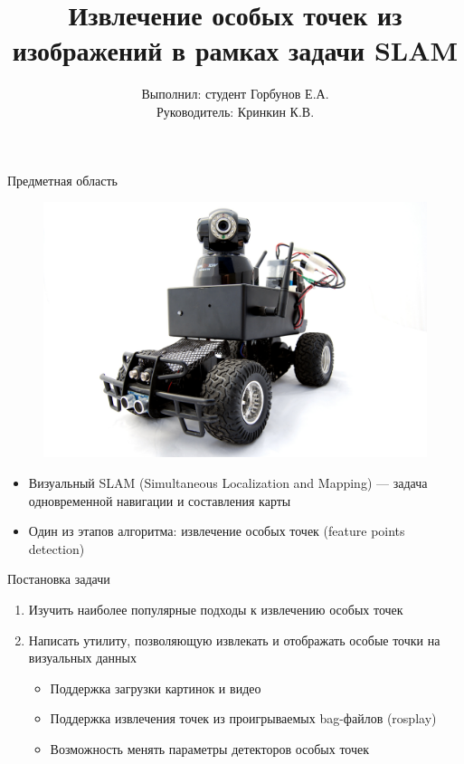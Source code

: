 


\usepackage[scale=2]{ccicons}

\usetikzlibrary{positioning,shapes,shadows,arrows}


\title{Извлечение особых точек из изображений в рамках задачи SLAM}
\author{
Выполнил: \hfill студент Горбунов Е.А. \\
Руководитель: \hfill Кринкин К.В.
}


\maketitle

\begin{frame}[fragile]{Предметная область}

\begin{figure}
\centering
\includegraphics[scale=0.31]{data/robot-01}
\end{figure}
\begin{itemize}
\item Визуальный SLAM (Simultaneous Localization and Mapping) --- задача одновременной навигации и составления карты
\item Один из этапов алгоритма: извлечение особых точек (feature points detection)
\end{itemize}
\end{frame}

\begin{frame}{Постановка задачи}
\begin{enumerate}
\item Изучить наиболее популярные подходы к извлечению особых точек
\item Написать утилиту, позволяющую извлекать и отображать особые точки на визуальных данных
	\begin{itemize}
		\item Поддержка загрузки картинок и видео
		\item Поддержка извлечения точек из проигрываемых bag-файлов (rosplay)
		\item Возможность менять параметры детекторов особых точек
	\end{itemize}
\end{enumerate}
\end{frame}

